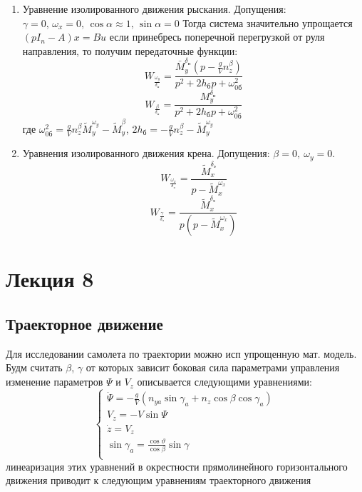 \documentclass{article}
\begin{document}
\begin{enumerate}
	\item Уравнение изолированного движения рыскания. Допущения: $\gamma = 0, \, \omega_x = 0, \, \cos{\alpha} \approx 1,\,\sin{\alpha} = 0$
	      Тогда система значительно упрощается 
	      $(pI_n - A)x = B u$
	      если принебресь поперечной перегрузкой от руля направления, то получим передаточные функции:
	      \[
              W_{\frac{\omega_y}{\delta_\text{н}}}= \frac{\bar{M}_y^{\delta_\text{н}} (p - \frac{g}{V} n_z^\beta)}{p^2 + 2 h_\text{б}p + \omega^2_{0\text{б}}}
	      \]
	      \[
              W_{\frac{\beta}{\delta_\text{н}}} = \frac{M_y^{\delta_\text{н}}}{p^2 + 2 h_\text{б}p + \omega^2_{0\text{б}}}
	      \]
          где $\omega_{0\text{б}}^2 = \frac{g}{V} n_z^\beta \tilde{M}_y^{\omega_y} - \tilde{M}_y^\beta$, $2h_\text{б} = -\frac{g}{V} n_z^\beta - \tilde{M}_y^{\omega_y}$
	\item Уравнения изолированного движения крена. Допущения: $\beta = 0,\ \omega_y = 0$.
	      \[
              W_{\frac{\omega_x}{\delta_\text{э}}} = \frac{\tilde{M}_x^{\delta_\text{э}}}{p - \tilde{M}_x^{\omega_x}}
	      \]
	      \[
              W_{\frac{\gamma}{\delta_\text{э}}} = \frac{\tilde{M}_x^{\delta_\text{э}}}{p(p - \tilde{M}_x^{\omega_x})}
	      \]
\end{enumerate}
\newpage

\section{Лекция 8}
\subsection{Траекторное движение}
Для исследовании самолета по траектории можно исп упрощенную мат. модель. Будм считать $\beta$, $\gamma$ от которых зависит боковая сила параметрами управления изменение параметров $\Psi$ и $V_z$ описывается следующими уравнениями:
\begin{equation}
	\begin{cases}
		\dot{\Psi} = -\frac{g}{V}(n_{ya} \sin{\gamma_a} + n_z \cos{\beta} \cos{\gamma_a}) \\
		V_z = -V\sin{\Psi}                                                                \\
		\dot{z} = V_z                                                                     \\
		
		\sin{\gamma_a} = \frac{\cos{\vartheta}}{\cos{\beta}} \sin{\gamma}                 \\
	\end{cases}
\end{equation}
линеаризация этих уравнений в окрестности прямолинейного горизонтального движения приводит к следующим уравнениям траекторного движения
\end{document}
